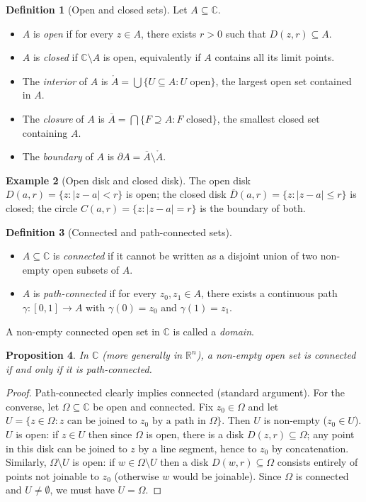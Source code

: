 \documentclass[12pt,a4paper,openany]{book}
\theoremstyle{definition}
\newtheorem{definition}{Definition}[chapter]
\newtheorem{example}[definition]{Example}
\theoremstyle{plain}
\newtheorem{proposition}[definition]{Proposition}
\theoremstyle{remark}
\newcommand{\C}{\mathbb{C}}
\newcommand{\R}{\mathbb{R}}
\newcommand{\abs}[1]{\left|#1\right|}
\newcommand{\conj}[1]{\overline{#1}}
\begin{document}
\begin{definition}[Open and closed sets]
\label{def:open-closed}
Let $A\subseteq\C$.
\begin{itemize}
  \item $A$ is \emph{open} if for every $z\in A$, there exists $r>0$ such that $D(z,r)\subseteq A$.
  \item $A$ is \emph{closed} if $\C\setminus A$ is open, equivalently if $A$ contains all its limit points.
  \item The \emph{interior} of $A$ is $\mathring{A} = \bigcup\{U\subseteq A : U \text{ open}\}$, the largest open set contained in $A$.
  \item The \emph{closure} of $A$ is $\overline{A} = \bigcap\{F\supseteq A : F \text{ closed}\}$, the smallest closed set containing $A$.
  \item The \emph{boundary} of $A$ is $\partial A = \overline{A}\setminus\mathring{A}$.
\end{itemize}
\end{definition}

\begin{example}[Open disk and closed disk]
The open disk $D(a,r)=\{z:\abs{z-a}<r\}$ is open; the closed disk $\conj{D}(a,r)=\{z:\abs{z-a}\leq r\}$ is closed; the circle $C(a,r)=\{z:\abs{z-a}=r\}$ is the boundary of both.
\end{example}

\begin{definition}[Connected and path-connected sets]
\label{def:connected}
\leavevmode
\begin{itemize}
  \item $A\subseteq\C$ is \emph{connected} if it cannot be written as a disjoint union of two non-empty open subsets of $A$.
  \item $A$ is \emph{path-connected} if for every $z_0,z_1\in A$, there exists a continuous path $\gamma:[0,1]\to A$ with $\gamma(0)=z_0$ and $\gamma(1)=z_1$.
\end{itemize}
A non-empty connected open set in $\C$ is called a \emph{domain}.
\end{definition}

\begin{proposition}
\label{prop:path-connected}
In $\C$ (more generally in $\R^n$), a non-empty open set is connected if and only if it is path-connected.
\end{proposition}

\begin{proof}
Path-connected clearly implies connected (standard argument). For the converse, let $\Omega\subseteq\C$ be open and connected. Fix $z_0\in\Omega$ and let $U = \{z\in\Omega : z \text{ can be joined to } z_0 \text{ by a path in } \Omega\}$. Then $U$ is non-empty ($z_0\in U$). $U$ is open: if $z\in U$ then since $\Omega$ is open, there is a disk $D(z,r)\subseteq\Omega$; any point in this disk can be joined to $z$ by a line segment, hence to $z_0$ by concatenation. Similarly, $\Omega\setminus U$ is open: if $w\in\Omega\setminus U$ then a disk $D(w,r)\subseteq\Omega$ consists entirely of points not joinable to $z_0$ (otherwise $w$ would be joinable). Since $\Omega$ is connected and $U\neq\emptyset$, we must have $U = \Omega$.
\end{proof}
\end{document}
